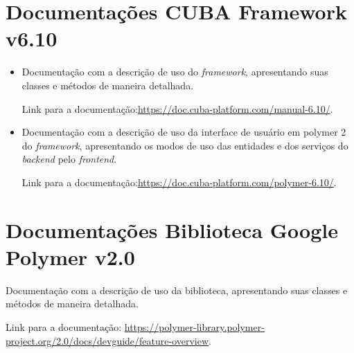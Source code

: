 \begin{anexosenv}

\partanexos

\chapter{Documentações CUBA Framework v6.10}
\label{anex:doc-cuba}
\begin{itemize}

    \item Documentação com a descrição de uso do \textit{framework}, apresentando suas classes e métodos de maneira detalhada.

    Link para a documentação:\url{https://doc.cuba-platform.com/manual-6.10/}.
    
    \item Documentação com a descrição de uso da interface de usuário em polymer 2 do \textit{framework}, apresentando os modos de uso das entidades e dos serviços do \textit{backend} pelo \textit{frontend}.

    Link para a documentação:\url{https://doc.cuba-platform.com/polymer-6.10/}.

\end{itemize}


\chapter{Documentações Biblioteca Google Polymer v2.0}
\label{anex:doc-polymer}

Documentação com a descrição de uso da biblioteca, apresentando suas classes e métodos de maneira detalhada.

Link para a documentação:
\url{https://polymer-library.polymer-project.org/2.0/docs/devguide/feature-overview}.



\end{anexosenv}